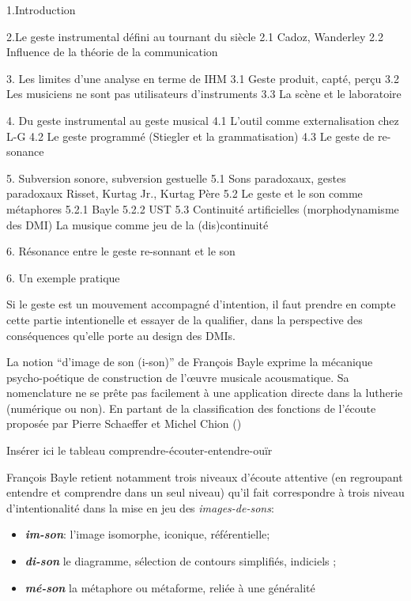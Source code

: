 1.Introduction

2.Le geste instrumental défini au tournant du siècle
	2.1 Cadoz, Wanderley
	2.2 Influence de la théorie de la communication

3. Les limites d'une analyse en terme de IHM
	3.1 Geste produit, capté, perçu
	3.2 Les musiciens ne sont pas utilisateurs d'instruments
	3.3 La scène et le laboratoire

4. Du geste instrumental au geste musical
	4.1 L'outil comme externalisation chez L-G
	4.2 Le geste programmé (Stiegler et la grammatisation)
	4.3 Le geste de re-sonance

5. Subversion sonore, subversion gestuelle
	5.1 Sons paradoxaux, gestes paradoxaux
		Risset, Kurtag Jr., Kurtag Père
	5.2 Le geste et le son comme métaphores
		5.2.1 Bayle
		5.2.2 UST
	5.3 Continuité artificielles (morphodynamisme des DMI)
		La musique comme jeu de la (dis)continuité

6. Résonance entre le geste re-sonnant et le son

6. Un exemple pratique 



Si le geste est un mouvement accompagné d'intention, il faut prendre en compte cette partie intentionelle et essayer de la qualifier, dans la perspective des conséquences qu'elle porte au design des \glspl{DMI}.

La notion ``d'image de son (i-son)'' de François Bayle exprime la mécanique psycho-poétique de construction de l'œuvre musicale acousmatique. Sa nomenclature ne se prête pas facilement à une application directe dans la lutherie (numérique ou non).
En partant de la classification des fonctions de l'écoute proposée par Pierre Schaeffer et Michel Chion (\cite{schaeffer Chion Guide objets sonores page 26}) 

Insérer ici le tableau comprendre-écouter-entendre-ouïr

François Bayle retient notamment trois niveaux d'écoute attentive (en regroupant entendre et comprendre dans un seul niveau) qu'il fait correspondre à trois niveau d'intentionalité dans la mise en jeu des \textit{images-de-sons}:
\vspace{-1em}
\begin{itemize}[noitemsep]
\item \textbf{\textit{im-son}}: l'image isomorphe, iconique, référentielle;
\item \textbf{\textit{di-son}} le diagramme, sélection de contours simplifiés, indiciels ;
\item \textbf{\textit{mé-son}} la métaphore ou métaforme, reliée à une généralité
\end{itemize}

